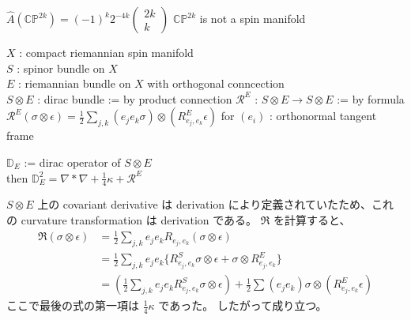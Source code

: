 \begin{Theorem}
\itemprop
  \(\hat{A}(\mathbb{CP}^{2k}) = (-1)^k2^{-4k} \begin{pmatrix} 2k \\ k \end{pmatrix}\)
\itemprop
  \(\mathbb{CP}^{2k}\) is not a spin manifold
\end{Theorem}

\begin{Definition}
\itemwhen
  \Fix \(X\) : compact riemannian spin manifold \\
  \Fix \(S\) : spinor bundle on \(X\) \\
  \Fix \(E\) : riemannian bundle on \(X\) with orthogonal conncection \\
  \Let \(S \otimes E\) : dirac bundle := by product connection 
\itemdefi 
  \Define \(\mathcal{R}^E\) : \(S \otimes E \to S \otimes E\) := by formula \(\mathcal{R}^E(\sigma \otimes \epsilon) = \frac{1}{2}\sum_{j,k} (e_j e_k \sigma) \otimes (R_{e_j , e_k}^E \epsilon)\) for \((e_i)\) : orthonormal tangent frame
\end{Definition}

\begin{Theorem}
\itemprop
  \Let \(\mathbb{D}_E\) := dirac operator of \(S \otimes E\) \\
  then \(\mathbb{D}_E^2 = \nabla * \nabla + \frac{1}{4}\kappa + \mathcal{R}^E\)
\end{Theorem}

\begin{Proof}
\itemprof
  \(S \otimes E\) 上の covariant derivative は derivation により定義されていたため、これの curvature transformation は derivation である。
  \(\mathfrak{R}\) を計算すると、
  \begin{align*}
    \mathfrak{R}(\sigma \otimes \epsilon)
    &= \frac{1}{2} \sum_{j,k} e_j e_k R_{e_j,e_k}(\sigma \otimes \epsilon) \\
    &= \frac{1}{2} \sum_{j,k} e_j e_k \{R^S_{e_j,e_k}\sigma \otimes \epsilon + \sigma \otimes R^E_{e_j,e_k}\} \\
    &= (\frac{1}{2} \sum_{j,k} e_j e_k R^S_{e_j,e_k} \sigma \otimes \epsilon) + \frac{1}{2} \sum (e_j e_k) \sigma \otimes (R^E_{e_j,e_k} \epsilon)
  \end{align*}
  ここで最後の式の第一項は \(\frac{1}{4}\kappa\) であった。
  したがって成り立つ。
\end{Proof}